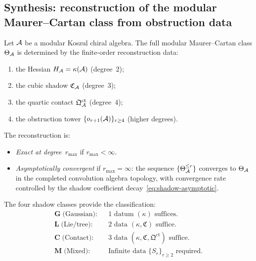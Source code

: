 
\subsection{Synthesis: reconstruction of the modular
Maurer--Cartan class from obstruction data}
\label{subsec:holographic-synthesis}

\begin{theorem}
\label{thm:holographic-reconstruction}
Let $\mathcal{A}$ be a modular Koszul chiral algebra. The full modular
Maurer--Cartan class $\Theta_{\mathcal{A}}$ is determined by the
finite-order reconstruction data:
\begin{enumerate}[label=\textup{(\roman*)}]
\item the Hessian $H_{\mathcal{A}} = \kappa(\mathcal{A})$
 \textup{(}degree~$2$\textup{)};
\item the cubic shadow $\mathfrak{C}_{\mathcal{A}}$
 \textup{(}degree~$3$\textup{)};
\item the quartic contact $\mathfrak{Q}^{\mathrm{ct}}_{\mathcal{A}}$
 \textup{(}degree~$4$\textup{)};
\item the obstruction tower
 $\{o_{r+1}(\mathcal{A})\}_{r \geq 4}$
 \textup{(}higher degrees\textup{)}.
\end{enumerate}
The reconstruction is:
\begin{itemize}
\item \emph{Exact at degree~$r_{\max}$} if
 $r_{\max} < \infty$.
\item \emph{Asymptotically convergent} if
 $r_{\max} = \infty$: the sequence
 $\{\Theta_{\mathcal{A}}^{\leq r}\}$ converges to $\Theta_{\mathcal{A}}$
 in the completed convolution algebra topology, with
 convergence rate controlled by the shadow coefficient
 decay~\eqref{eq:shadow-asymptotic}.
\end{itemize}
The four shadow classes provide the classification:
\[
\begin{array}{lcl}
\textbf{G}\;\text{(Gaussian)}: & &
 \text{1 datum } (\kappa) \text{ suffices.}\\
\textbf{L}\;\text{(Lie/tree)}: & &
 \text{2 data } (\kappa, \mathfrak{C}) \text{ suffice.}\\
\textbf{C}\;\text{(Contact)}: & &
 \text{3 data }
 (\kappa, \mathfrak{C}, \mathfrak{Q}^{\mathrm{ct}})
 \text{ suffice.}\\
\textbf{M}\;\text{(Mixed)}: & &
 \text{Infinite data }
 \{S_r\}_{r \geq 2} \text{ required.}
\end{array}
\]
\end{theorem}

